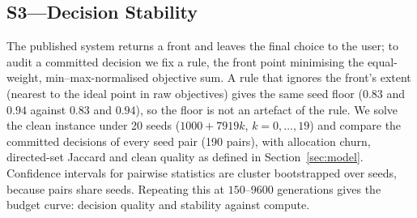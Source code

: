 \documentclass[systems,article,accept,moreauthors,pdftex]{Definitions/mdpi}
\begin{document}
\subsection{S3---Decision Stability}
The published system returns a front and leaves the final choice to the user; to audit a
committed decision we fix a rule, the front point minimising the equal-weight,
min--max-normalised objective sum. A rule that ignores the front's extent (nearest to the
ideal point in raw objectives) gives the same seed floor ($0.83$ and $0.94$ against $0.83$
and $0.94$), so the floor is not an artefact of the rule. We solve the clean instance under 20 seeds
($1000 + 7919k$, $k = 0,\dots,19$) and compare the committed decisions of every seed pair
(190 pairs), with allocation churn, directed-set Jaccard and clean quality as defined in
Section~\ref{sec:model}. Confidence intervals for pairwise statistics are cluster bootstrapped
over seeds, because pairs share seeds. Repeating this at $150$--$9600$ generations gives the
budget curve: decision quality and stability against compute.
\end{document}
